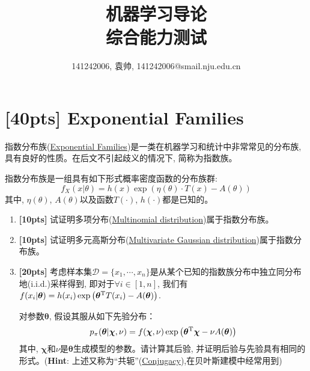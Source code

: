 \documentclass[a4paper,UTF8]{article}
\numberwithin{equation}{section}
\theoremstyle{definition}
\begin{document}
\title{机器学习导论\\
综合能力测试}
\author{141242006, 袁帅, 141242006@smail.nju.edu.cn}
\maketitle
\section{[40pts] Exponential Families}
\label{Exponential Families}
指数分布族(\href{https://en.wikipedia.org/wiki/Exponential_family}{Exponential Families})是一类在机器学习和统计中非常常见的分布族, 具有良好的性质。在后文不引起歧义的情况下, 简称为指数族。

指数分布族是一组具有如下形式概率密度函数的分布族群:
\begin{equation}
f_X(x|\theta) = h(x) \exp \left(\eta(\theta) \cdot T(x) -A(\theta)\right)
\end{equation}  
其中, $\eta(\theta)$, $A(\theta)$以及函数$T(\cdot)$, $h(\cdot)$都是已知的。
\begin{enumerate}[(1)]
\item \textbf{[10pts]} 试证明多项分布(\href{https://en.wikipedia.org/wiki/Multinomial_distribution}{Multinomial distribution})属于指数分布族。

\item \textbf{[10pts]} 试证明多元高斯分布(\href{https://en.wikipedia.org/wiki/Multivariate_normal_distribution}{Multivariate Gaussian distribution})属于指数分布族。

\item \textbf{[20pts]} 考虑样本集$\mathcal{D}=\{ x_1,\cdots, x_n\}$是从某个已知的指数族分布中独立同分布地(i.i.d.)采样得到, 即对于$\forall i\in [1,n]$, 我们有$f( x_i|\boldsymbol\theta) = h(x_i) \exp \left ( {\boldsymbol\theta}^{\rm T}T(x_i) -A(\boldsymbol\theta)\right)$. 

对参数$\boldsymbol\theta$, 假设其服从如下先验分布：
\begin{equation}
p_\pi(\boldsymbol\theta|\boldsymbol\chi,\nu) = f(\boldsymbol\chi,\nu) \exp \left (\boldsymbol\theta^{\rm T} \boldsymbol\chi - \nu A(\boldsymbol\theta) \right )
\end{equation}
其中, $\boldsymbol\chi$和$\nu$是$\boldsymbol\theta$生成模型的参数。请计算其后验, 并证明后验与先验具有相同的形式。(\textbf{Hint}: 上述又称为“共轭”(\href{https://people.eecs.berkeley.edu/~jordan/courses/260-spring10/other-readings/chapter9.pdf}{Conjugacy}),在贝叶斯建模中经常用到)
\end{enumerate}
\end{document}
